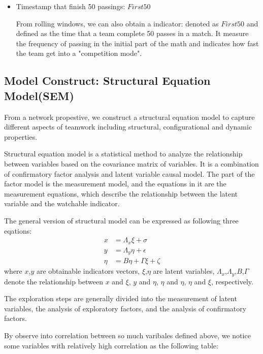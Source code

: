 \documentclass{mcmthesis}
\begin{document}
\begin{itemize}
  \item Timestamp that finish 50 passings: $First50$
  
  From rolling windows, we can also obtain a indicator: denoted as $First50$ and defined as the time that a team complete 50 passes in a match.\cite{1} It measure the frequency of passing in the initial part of the math and indicates how fast the team get into a "competition mode".
\end{itemize}



\subsection{Model Construct: Structural Equation Model(SEM)}

From a network propestive, we construct a structural equation model to capture different aspects of teamwork including structural, configurational and dynamic properties. 

Structural equation model is a statistical method to analyze the relationship between variables based on the covariance matrix of variables. It is a combination of confirmatory factor analysis and latent variable causal model. The part of the factor model is the measurement model, and the equations in it are the measurement equations, which describe the relationship between the latent variable and the watchable indicator.

The general version of structural model can be expressed as following three eqations:
\begin{equation*}
  \begin{split}
    x &= \Lambda_x \xi + \sigma \\
    y &= \Lambda_y \eta + \epsilon \\
    \eta &= B\eta + \Gamma\xi + \zeta
  \end{split}
\end{equation*}
where $x$,$y$ are obtainable indicators vectors, $\xi$,$\eta$ are latent variables, $\Lambda_x$,$\Lambda_y$,$B$,$\Gamma$ denote the relationship between $x$ and $\xi$, $y$ and $\eta$, $\eta$ and $\eta$, $\eta$ and $\xi$, respectively.

The exploration steps are generally divided into the measurement of latent variables, the analysis of exploratory factors, and the analysis of confirmatory factors.

By observe into correlation between so much varibales defined above, we notice some variables with relatively high correlation as the following table:
\end{document}
